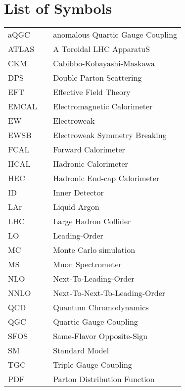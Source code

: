 \chapter*{List of Symbols}
  \begin{tabular}{lp{}p{}}
    aQGC        & \dotfill & anomalous Quartic Gauge Coupling \\
    ATLAS       & \dotfill & A Toroidal LHC ApparatuS \\
    CKM         & \dotfill & Cabibbo-Kobayashi-Maskawa \\
    DPS         & \dotfill & Double Parton Scattering \\
    EFT         & \dotfill & Effective Field Theory \\
    EMCAL       & \dotfill & Electromagnetic Calorimeter \\
    EW          & \dotfill & Electroweak \\
    EWSB        & \dotfill & Electroweak Symmetry Breaking \\
    FCAL        & \dotfill & Forward Calorimeter \\
    HCAL        & \dotfill & Hadronic Calorimeter \\
    HEC         & \dotfill & Hadronic End-cap Calorimeter \\
    ID          & \dotfill & Inner Detector \\
    LAr         & \dotfill & Liquid Argon \\
    LHC         & \dotfill & Large Hadron Collider \\
    LO          & \dotfill & Leading-Order \\
    MC          & \dotfill & Monte Carlo simulation \\
    MS          & \dotfill & Muon Spectrometer \\
    NLO         & \dotfill & Next-To-Leading-Order \\
    NNLO         & \dotfill & Next-To-Next-To-Leading-Order \\
    QCD         & \dotfill & Quantum Chromodynamics \\
    QGC         & \dotfill & Quartic Gauge Coupling \\
    SFOS        & \dotfill & Same-Flavor Opposite-Sign \\
    SM          & \dotfill & Standard Model  \\
    TGC         & \dotfill & Triple Gauge Coupling \\
    PDF         & \dotfill & Parton Distribution Function \\



  \end{tabular}

